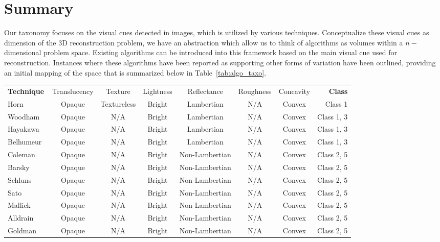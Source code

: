 \section{Summary}
Our taxonomy focuses on the visual cues detected in images, which is utilized by various techniques. Conceptualize these visual cues as dimension of the 3D reconstruction problem, we have an abstraction which allow us to think of algorithms as volumes within a $n-$dimensional problem space. Existing algorithms can be introduced into this framework based on the main visual cue used for reconstruction. Instances where these algorithms have been reported as supporting other forms of variation have been outlined, providing an initial mapping of the space that is summarized below in Table~\ref{tab:algo_taxo}.
\begin{sidewaystable}[h]
  \centering
  \begin{tabular}{l*{6}{c}r}
  \hline
  \textbf{Technique} & Translucency & Texture & Lightness & Reflectance & Roughness & Concavity & \textbf{Class}\\
  Horn~\cite{horn1970shape} & Opaque & Textureless & Bright & Lambertian & N/A & Convex & Class 1\\
  Woodham~\cite{woodham1980photometric} & Opaque & N/A & Bright & Lambertian & N/A & Convex & Class 1, 3\\
  Hayakawa~\cite{hayakawa1994photometric} & Opaque & N/A & Bright & Lambertian & N/A & Convex & Class 1, 3\\
  Belhumeur~\cite{belhumeur1999bas} & Opaque & N/A & Bright & Lambertian & N/A & Convex & Class 1, 3\\
  Coleman~\cite{coleman1982obtaining} & Opaque & N/A & Bright & Non-Lambertian & N/A & Convex & Class 2, 5\\
  Barsky~\cite{barsky20034} & Opaque & N/A & Bright & Non-Lambertian & N/A & Convex & Class 2, 5\\
  Schluns~\cite{schluns1993photometric} & Opaque & N/A & Bright & Non-Lambertian & N/A & Convex & Class 2, 5\\
  Sato~\cite{sato1994temporal} & Opaque & N/A & Bright & Non-Lambertian & N/A & Convex & Class 2, 5\\
  Mallick~\cite{mallick2005beyond} & Opaque & N/A & Bright & Non-Lambertian & N/A & Convex & Class 2, 5\\
  Alldrain~\cite{alldrin2008photometric} & Opaque & N/A & Bright & Non-Lambertian & N/A & Convex & Class 2, 5\\
  Goldman~\cite{goldman2010shape} & Opaque & N/A & Bright & Non-Lambertian & N/A & Convex & Class 2, 5\\

\end{tabular}
\end{sidewaystable}
